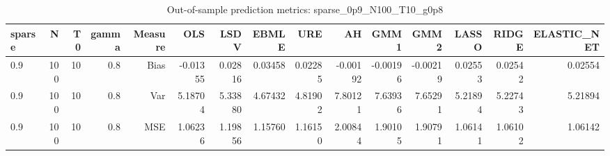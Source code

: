 \begin{table}[!htbp]\centering
\caption{Out-of-sample prediction metrics: sparse_0p9_N100_T10_g0p8}
\label{tab:table3_sparse_0p9_N100_T10_g0p8}
\begin{tabular}{lrrrrrrrrrrrrrr}
\hline
sparse & N & T0 & gamma & Measure & OLS & LSDV & EBMLE & URE & AH & GMM1 & GMM2 & LASSO & RIDGE & ELASTIC_NET \\
\hline
0.9 & 100 & 10 & 0.8 & Bias & -0.01355 & 0.02816 & 0.03458 & 0.02285 & -0.00192 & -0.00196 & -0.00219 & 0.02553 & 0.02542 & 0.02554 \\
0.9 & 100 & 10 & 0.8 & Var & 5.18704 & 5.33880 & 4.67432 & 4.81902 & 7.80121 & 7.63936 & 7.65291 & 5.21894 & 5.22743 & 5.21894 \\
0.9 & 100 & 10 & 0.8 & MSE & 1.06236 & 1.19856 & 1.15760 & 1.16150 & 2.00844 & 1.90105 & 1.90791 & 1.06141 & 1.06102 & 1.06142 \\
\hline
\end{tabular}
\end{table}

